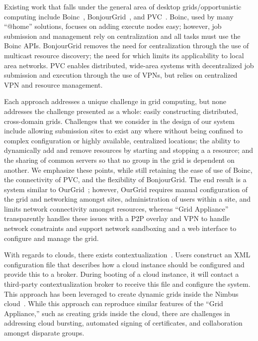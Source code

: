 \documentclass[twocolumn]{svjour3}
\begin{document}
Existing work that falls under the general area of desktop grids/opportunistic
computing include Boinc~\cite{boinc}, BonjourGrid~\cite{bonjourgrid}, and
PVC~\cite{pvc}.  Boinc, used by many ``@home'' solutions, focuses on adding
execute nodes easy; however, job submission and management rely on
centralization and all tasks must use the Boinc APIs.  BonjourGrid removes the
need for centralization through the use of multicast resource discovery; the
need for which limits its applicability to local area networks.  PVC enables
distributed, wide-area systems with decentralized job submission and execution
through the use of VPNs, but relies on centralized VPN and resource management.

Each approach addresses a unique challenge in grid computing, but none
addresses the challenge presented as a whole: easily constructing distributed,
cross-domain grids.  Challenges that we consider in the design of our system
include allowing submission sites to exist any where without being confined to
complex configuration or highly available, centralized locations; the ability
to dynamically add and remove resources by starting and stopping a a resource;
and the sharing of common servers so that no group in the grid is dependent on
another.  We emphasize these points, while still retaining the ease of use of
Boinc, the connectivity of PVC, and the flexibility of BonjourGrid.  The end
result is a system similar to OurGrid~\cite{ourgrid}; however, OurGrid requires
manual configuration of the grid and networking amongst sites, administration
of users within a site, and limits network connectivity amongst resources,
whereas ``Grid Appliance'' transparently handles these issues with a P2P
overlay and VPN to handle network constraints and support network sandboxing
and a web interface to configure and manage the grid.

With regards to clouds, there exists contextualization~\cite{context}.  Users
construct an XML configuration file that describes how a cloud instance should
be configured and provide this to a broker.  During booting of a cloud
instance, it will contact a third-party contextualization broker to receive
this file and configure the system.  This approach has been leveraged to create
dynamic grids inside the Nimbus cloud~\cite{alien_grid}.  While this approach
can reproduce similar features of the ``Grid Appliance,'' such as creating
grids inside the cloud, there are challenges in addressing cloud bursting,
automated signing of certificates, and collaboration amongst disparate groups.
\end{document}
